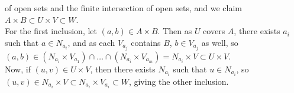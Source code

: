 \documentclass[a4paper]{article}
\begin{document}
of open sets and the finite intersection of open sets, and
we claim $A \times B \subset U \times V \subset W$.\\
For the first inclusion, let $(a,b) \in A \times B$. 
Then as $U$ covers $A$, there exists $a_i$ such that
$a \in N_{a_i}$, and as each $V_{a_j}$ contains $B$, 
$b \in V_{a_j}$ as well, so $(a,b) \in \left( N_{a_i} \times  V_{a_{1}} \right)
\cap \ldots \cap \left( N_{a_i} \times  V_{a_m} \right) 
= N_{a_i} \times  V \subset U \times V$.\\
\linebreak
Now, if $(u,v) \in U \times V$, then there exists $N_{a_i}$ such that
$u \in N_{a_i}$, so
$(u,v) \in N_{a_i} \times V \subset N_{a_i} \times V_{a_i} \subset W$, giving
the other inclusion.
\end{document}
